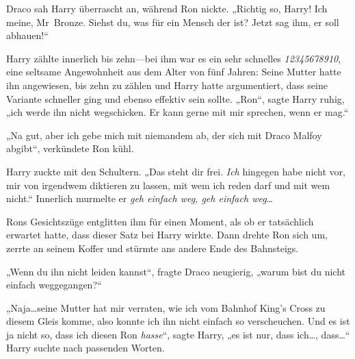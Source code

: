 Draco sah Harry überrascht an, während Ron nickte. „Richtig so, Harry! Ich meine, Mr~Bronze. Siehst du, was für ein Mensch der ist? Jetzt sag ihm, er soll abhauen!“

Harry zählte innerlich bis zehn—bei ihm war es ein sehr schnelles \emph{12345678910}, eine seltsame Angewohnheit aus dem Alter von fünf Jahren: Seine Mutter hatte ihn angewiesen, bis zehn zu zählen und Harry hatte argumentiert, dass seine Variante schneller ging und ebenso effektiv sein sollte. „Ron“, sagte Harry ruhig, „ich werde ihn nicht wegschicken. Er kann gerne mit mir sprechen, wenn er mag.“

„Na gut, aber ich gebe mich mit niemandem ab, der sich mit Draco Malfoy abgibt“, verkündete Ron kühl.

Harry zuckte mit den Schultern. „Das steht dir frei. \emph{Ich} hingegen habe nicht vor, mir von irgendwem diktieren zu lassen, mit wem ich reden darf und mit wem nicht.“ Innerlich murmelte er \emph{geh einfach weg, geh einfach weg}…

Rons Gesichtszüge entglitten ihm für einen Moment, als ob er tatsächlich erwartet hatte, dass dieser Satz bei Harry wirkte. Dann drehte Ron sich um, zerrte an seinem Koffer und stürmte ans andere Ende des Bahnsteigs.

„Wenn du ihn nicht leiden kannst“, fragte Draco neugierig, „warum bist du nicht einfach weggegangen?“

„Naja…seine Mutter hat mir verraten, wie ich vom Bahnhof King’s Cross zu diesem Gleis komme, also konnte ich ihn nicht einfach so verscheuchen. Und es ist ja nicht so, dass ich diesen Ron \emph{hasse}“, sagte Harry, „es ist nur, dass ich…, dass…“ Harry suchte nach passenden Worten.

